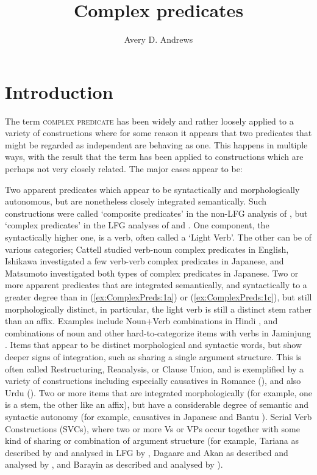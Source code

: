 \documentclass[output=paper,hidelinks]{langscibook}
\title{Complex predicates}
\author{Avery D. Andrews\affiliation{The Australian National University}}
\begin{document}
\maketitle
\label{chap:ComplexPreds}

\section{Introduction}
The term \textsc{complex predicate} has been widely and rather loosely applied to a
variety of constructions where for some reason it appears that two predicates that might
be regarded as independent are behaving as one.  This happens in multiple ways,
with the result that the term has been applied to constructions which are perhaps
not very closely related.
The major cases appear to be:
\ea\label{form}
\begin{xlist}
\ex\label{ex:ComplexPreds:1a} Two apparent predicates which appear to be syntactically and morphologically
autonomous, but are nonetheless closely integrated semantically.  Such constructions were called
`composite predicates' in the non-LFG analysis of \citet{Cattell1984}, but `complex predicates'
in the LFG analyses of \citet{Ishikawa1985}
and \citet{Matsumoto1996}. One component, the syntactically higher one, is a verb, often called
a `Light Verb'.  The other can be of various categories; Cattell studied verb-noun complex predicates in
English, Ishikawa investigated a few verb-verb complex predicates in Japanese, and Matsumoto investigated both types of complex predicates in Japanese. 
\ex Two or more apparent predicates that are integrated semantically, and syntactically
to a greater degree than in (\ref{ex:ComplexPreds:1a}) or (\ref{ex:ComplexPreds:1c}), but still morphologically distinct, in particular,
the light verb is still a distinct stem rather than an affix.  Examples include Noun+Verb
combinations in Hindi \citep{MohananT1994}, and combinations of noun and other hard-to-categorize
items with verbs in Jaminjung \citep{Schulze-Berndt2000}.
\ex\label{ex:ComplexPreds:1c}
Items that appear to be distinct morphological and syntactic words, but show deeper
signs of integration, such as sharing a single
argument structure.  This is often called Restructuring, Reanalysis, or Clause Union,
and is exemplified by a
variety of constructions including especially causatives in Romance (\citealt{alsina1996the-role,Alsina1997,AndrewsManning1999,Andrews2018shs,Manning1992,Manning1996rcp}), and also Urdu (\citealt{Butt1995,Butt1997,Lowe2015}).
\ex Two or more items that are integrated morphologically (for example, one is
a stem, the other like an affix), but have a considerable degree of semantic
and syntactic autonomy (for example, causatives in Japanese \citep{Ishikawa1985} and
Bantu \citep{Alsina1997}).
\ex Serial Verb Constructions (SVCs), where two or more Vs or VPs occur together with some
kind of sharing or combination of argument structure (for example, Tariana as described by
\citealt{Aikhenvald2003} and analysed in LFG
by \citealt{AndrewsManning1999}, Dagaare and Akan as described and analysed by \citealt{Bodomo1996,Bodomo1997}, and Barayin as described and analysed by \citealt{Lovestrand2018}).
\end{xlist}
\z
\end{document}
